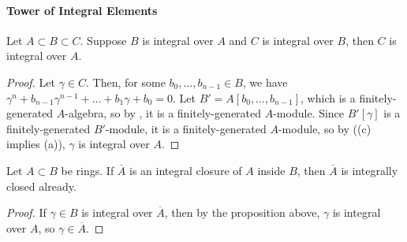 \paragraph{Tower of Integral Elements}
\begin{proposition}
    \label{prop:integral_transitive}
    Let $A\subset B\subset C$. Suppose $B$ is integral over $A$
    and $C$ is integral over $B$, then
    $C$ is integral over $A$.
\end{proposition}
\begin{proof}
    Let $\gamma\in C$. Then, for some $b_0,\dots,b_{n-1}\in B$,
    we have $\gamma^n + b_{n-1}\gamma^{n-1} + \dots + b_1\gamma+b_0=0$.
    Let $B'=A[b_0,\dots,b_{n-1}]$,
    which is a finitely-generated $A$-algebra,
    so by ,
    it is a finitely-generated $A$-module.
    Since $B'[\gamma]$ is a finitely-generated $B'$-module, it is a finitely-generated $A$-module,
    so by  ((c) implies (a)), $\gamma$ is integral over $A$.
\end{proof}
\begin{corollary}
    \label{cor:integral_closure_one_step}
    Let $A\subset B$ be rings.
    If $\overline A$ is an integral closure of $A$ inside $B$,
    then $\overline A$ is integrally closed already.
\end{corollary}
\begin{proof}
    If $\gamma\in B$ is integral over $\overline A$,
    then by the proposition above,
    $\gamma$ is integral over $A$, so $\gamma\in\overline A$.
\end{proof}
